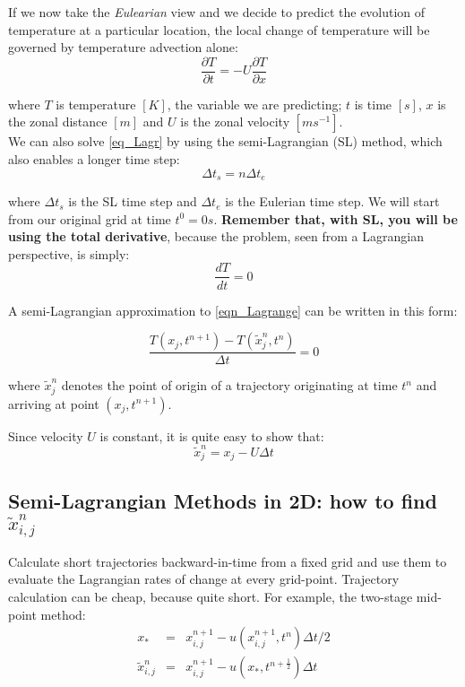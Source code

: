 If we now take the \emph{Eulearian} view and we decide to predict the evolution of temperature at a particular location, the local change of temperature will be governed by temperature advection alone: 
\begin{equation}
\frac{\partial T } {\partial t} = -U \frac{\partial T } {\partial x}
\label{eq_Eul}
\end{equation}

where $T$ is temperature $[K]$, the variable we are predicting; $t$ is time $[s]$, $x$ is the zonal distance $[m]$ and $U$ is the zonal velocity $[ms^{-1}]$.\\

We can also solve \ref{eq_Lagr} by using the semi-Lagrangian (SL) method, which also enables a longer time step: 
\begin{equation}
\Delta t_{s}=n\Delta t_{e}
\end{equation}

where $\Delta t_{s}$ is the SL time step and $\Delta t_{e}$ is the Eulerian time step.
We will start from our original grid at time $t^0=0s$. \textbf{Remember that, with SL, you will be using the total derivative}, because the problem, seen from a Lagrangian perspective, is simply:
\begin{equation}
\frac{d T } {d t} = 0
\label{eqn_Lagrange}
\end{equation}

A semi-Lagrangian approximation to \ref{eqn_Lagrange} can be written in this form:

\begin{equation}
\frac {T(x_j,t^{n+1})-T(\tilde{x}^n_j,t^n)}{\Delta t} = 0
\end{equation}

where $\tilde{x}^n_j$ denotes the point of origin of a trajectory originating at time $t^n$ and arriving at point $(x_j,t^{n+1})$.

Since velocity $U$ is constant, it is quite easy to show that:
\begin{equation}
\tilde{x}^n_j=x_j-U \Delta t
\label{eqn_departure_point}
\end{equation}


\subsection{Semi-Lagrangian Methods in 2D: how to find $\tilde{x}^n_{i,j}$}

	
	Calculate short trajectories backward-in-time from a fixed grid and
	use them to evaluate the Lagrangian rates of change at every
	grid-point. Trajectory calculation can be cheap, because quite short. 
	For example, the two-stage mid-point method:
	\begin{eqnarray*}
		x_* & = & x^{n+1}_{i,j}-u(x^{n+1}_{i,j},t^n) \Delta t/2 \\
		\tilde{x}^n_{i,j} & = & x^{n+1}_{i,j}-u(x_*,t^{n+\frac{1}{2}}) \Delta t
	\end{eqnarray*}
	
